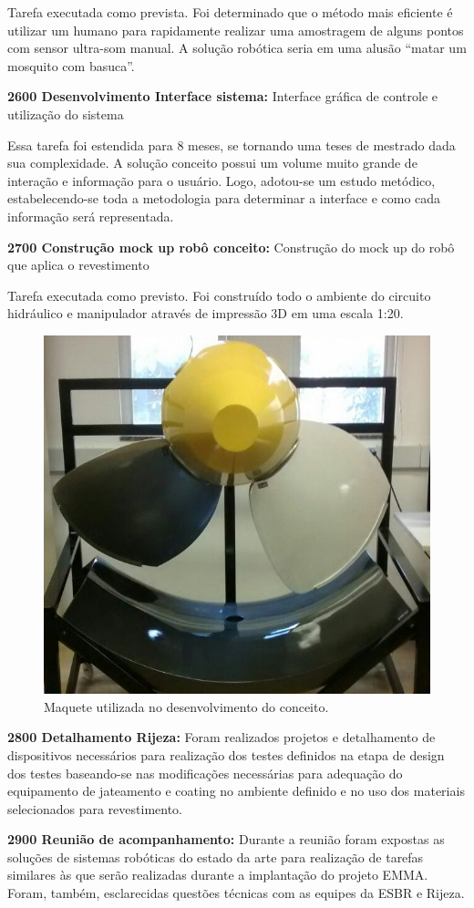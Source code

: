 Tarefa executada como prevista. Foi determinado que o método mais eficiente é
utilizar um humano para rapidamente realizar uma amostragem de alguns pontos com
sensor ultra-som manual. A solução robótica seria em uma alusão “matar um mosquito com basuca”.

\noindent
\textbf{2600 Desenvolvimento Interface sistema:} Interface gráfica de controle e
utilização do sistema

Essa tarefa foi estendida para 8 meses, se tornando uma teses de mestrado dada
sua complexidade. A solução conceito possui um volume muito grande de interação
e informação para o usuário. Logo, adotou-se um estudo metódico,
estabelecendo-se toda a metodologia para determinar a interface e como cada
informação será representada.

\noindent
\textbf{2700 Construção mock up robô conceito:} Construção do mock up do robô
que aplica o revestimento

Tarefa executada como previsto. Foi construído todo o ambiente do circuito
hidráulico e manipulador através de impressão 3D em uma escala 1:20.

\begin{figure}[h!]
\centering
\includegraphics[width=0.6\columnwidth]{figs/maquete}
\caption{Maquete utilizada no desenvolvimento do conceito.}
\end{figure} 

  
\noindent
\textbf{2800 Detalhamento Rijeza:} Foram realizados projetos e detalhamento de
dispositivos necessários para realização dos testes definidos na etapa de
design dos testes baseando-se nas modificações necessárias para adequação do
equipamento de jateamento e coating no ambiente definido e no uso dos materiais
selecionados para revestimento.

\noindent
\textbf{2900 Reunião de acompanhamento:} Durante a reunião foram expostas as
soluções de sistemas robóticas do estado da arte para realização de tarefas
similares às que serão realizadas durante a implantação	do projeto EMMA. Foram,
também, esclarecidas questões técnicas com as equipes da ESBR e Rijeza.

